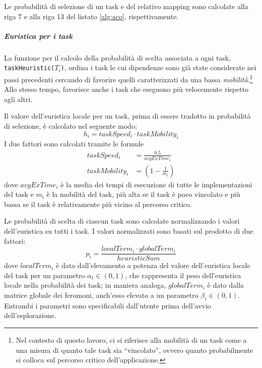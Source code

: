 Le probabilit\`a di selezione di un task e del relativo mapping sono calcolate alla riga 7 e alla riga
13 del listato \ref{alg:aco}, rispettivamente.

\subparagraph{Euristica per i task}
La funzione per il calcolo della probabilit\`a di scelta associata a ogni task,
\verb+taskHeuristic(+$T_i$\verb+)+, ordina i task le cui dipendenze sono gi\`a state
considerate nei passi precedenti cercando di favorire quelli caratterizzati da una bassa
\emph{mobilit\`a}.\footnote{Nel contesto di questo lavoro, ci si riferisce alla mobilit\`a di un
  task come a una misura di quanto tale task sia ``vincolato'', ovvero quanto probabilmente
si colloca sul percorso critico dell'applicazione.}
Allo stesso tempo, favorisce anche i task che eseguono pi\`u velocemente rispetto agli altri.

Il valore dell'euristica locale per un task, prima di essere tradotto in probabilit\`a di
selezione, \`e calcolato nel seguente modo:
\begin{equation}
  h_i = taskSpeed_i \cdot taskMobility_i
\end{equation}
I due fattori sono calcolati tramite le formule
\begin{align*}
  taskSpeed_i &= \frac{0.5}{avgExTime_i}\\
  taskMobility_i &= (1 - \frac{1}{m_i})
\end{align*}
dove $avgExTime_i$ \`e la media dei tempi di esecuzione di tutte le implementazioni del task
e $m_i$ \`e la mobilit\`a del task, pi\`u alta se il task \`e poco vincolato e pi\`u bassa se il task
\`e relativamente pi\`u vicino al percorso critico.

Le probabilit\`a di scelta di ciascun task sono calcolate normalizzando i valori dell'euristica
su tutti i task. I valori normalizzati sono basati sul prodotto di due fattori:
\begin{equation}
  p_i = \frac{localTerm_i \cdot globalTerm_i}{heuristicSum}
\end{equation}
dove $localTerm_i$ \`e dato dall'elevamento a potenza del valore dell'euristica locale del
task per un parametro $\alpha_t \in (0,1)$, che rappresenta il peso dell'euristica locale
nella probabilit\`a dei task; in maniera analoga, $globalTerm_i$ \`e dato dalla matrice globale dei feromoni,
anch'esso elevato a un parametro $\beta_t \in (0,1)$. Entrambi i parametri sono specificabili
dall'utente prima dell'avvio dell'esplorazione.

